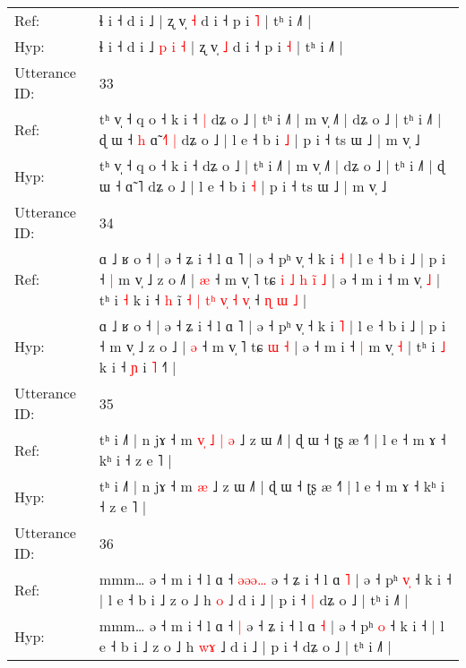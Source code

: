 \documentclass[10pt]{article}
\DeclareRobustCommand{\hl}[1]{{\textcolor{red}{#1}}}
\begin{document}
\begin{longtable}{ll}
Ref: & ɬ i ˧ d i ˩\hl{}\hl{}\hl{}\hl{}\hl{}\hl{} | ʐ v̩ \hl{˧} d i ˧ p i \hl{˥} | tʰ i ˩˥ |
 \\
Hyp: & ɬ i ˧ d i ˩\hl{ }\hl{p}\hl{ }\hl{i}\hl{ }\hl{˧} | ʐ v̩ \hl{˩} d i ˧ p i \hl{˧} | tʰ i ˩˥ |
 \\
\midrule
Utterance ID: & 33 \\
Ref: & tʰ v̩ ˧ q o ˧ k i ˧\hl{ }\hl{|} dʑ o ˩ | tʰ i ˩˥ | m v̩ ˩˥ | dʑ o ˩ | tʰ i ˩˥ | ɖ ɯ ˧\hl{ }\hl{h} ɑ̃ \hl{˧}˥\hl{ }\hl{|} dʑ o ˩ | l e ˧ b i \hl{˩} | p i ˧ ts ɯ ˩ | m v̩ ˩
 \\
Hyp: & tʰ v̩ ˧ q o ˧ k i ˧\hl{}\hl{} dʑ o ˩ | tʰ i ˩˥ | m v̩ ˩˥ | dʑ o ˩ | tʰ i ˩˥ | ɖ ɯ ˧\hl{}\hl{} ɑ̃ \hl{}˥\hl{}\hl{} dʑ o ˩ | l e ˧ b i \hl{˧} | p i ˧ ts ɯ ˩ | m v̩ ˩
 \\
\midrule
Utterance ID: & 34 \\
Ref: & ɑ ˩ ʁ o ˧ | ə ˧ ʑ i ˧ l ɑ ˥ | ə ˧ pʰ v̩ ˧ k i \hl{˧} | l e ˧ b i ˩ | p i ˧\hl{ }\hl{|} m v̩ ˩ z o ˩\hl{˥} | \hl{æ} ˧ m v̩ ˥ tɕ\hl{ }\hl{i}\hl{ }\hl{˩}\hl{ }\hl{h} \hl{i}\hl{̃} \hl{˩} | ə ˧ m i ˧\hl{}\hl{} m v̩ \hl{˩} | tʰ i \hl{˧} k i ˧ \hl{h} i\hl{̃}\hl{ }\hl{˧}\hl{ }\hl{|}\hl{ }\hl{t}\hl{ʰ}\hl{ }\hl{v}\hl{̩}\hl{ }\hl{˧} \hl{v}\hl{̩} ˧\hl{ }\hl{ɳ}\hl{ }\hl{ɯ}\hl{ }\hl{˩} |
 \\
Hyp: & ɑ ˩ ʁ o ˧ | ə ˧ ʑ i ˧ l ɑ ˥ | ə ˧ pʰ v̩ ˧ k i \hl{˥} | l e ˧ b i ˩ | p i ˧\hl{}\hl{} m v̩ ˩ z o ˩\hl{} | \hl{ə} ˧ m v̩ ˥ tɕ\hl{}\hl{}\hl{}\hl{}\hl{}\hl{} \hl{}\hl{ɯ} \hl{˧} | ə ˧ m i ˧\hl{ }\hl{|} m v̩ \hl{˧} | tʰ i \hl{˩} k i ˧ \hl{ɲ} i\hl{}\hl{}\hl{}\hl{}\hl{}\hl{}\hl{}\hl{}\hl{}\hl{}\hl{}\hl{}\hl{} \hl{}\hl{˥} ˧\hl{}\hl{}\hl{}\hl{}\hl{}\hl{˥} |
 \\
\midrule
Utterance ID: & 35 \\
Ref: & tʰ i ˩˥ | n jɤ ˧ m\hl{ }\hl{v}\hl{̩}\hl{ }\hl{˩}\hl{ }\hl{|} \hl{ə} ˩ z ɯ ˩˥ | ɖ ɯ ˧ ʈʂ æ ˧˥ | l e ˧ m ɤ ˧ kʰ i ˧ z e ˥ |
 \\
Hyp: & tʰ i ˩˥ | n jɤ ˧ m\hl{}\hl{}\hl{}\hl{}\hl{}\hl{}\hl{} \hl{æ} ˩ z ɯ ˩˥ | ɖ ɯ ˧ ʈʂ æ ˧˥ | l e ˧ m ɤ ˧ kʰ i ˧ z e ˥ |
 \\
\midrule
Utterance ID: & 36 \\
Ref: & mmm… ə ˧ m i ˧ l ɑ ˧ \hl{ə}\hl{ə}\hl{ə}\hl{…} ə ˧ ʑ i ˧ l ɑ \hl{˥} | ə ˧ pʰ \hl{v}\hl{̩} ˧ k i ˧ | l e ˧ b i ˩ z o ˩ h \hl{}\hl{o} ˩ d i ˩ | p i ˧\hl{ }\hl{|} dʑ o ˩ | tʰ i ˩˥ |
 \\
Hyp: & mmm… ə ˧ m i ˧ l ɑ ˧ \hl{}\hl{}\hl{}\hl{|} ə ˧ ʑ i ˧ l ɑ \hl{˧} | ə ˧ pʰ \hl{}\hl{o} ˧ k i ˧ | l e ˧ b i ˩ z o ˩ h \hl{w}\hl{ɤ} ˩ d i ˩ | p i ˧\hl{}\hl{} dʑ o ˩ | tʰ i ˩˥ |
 \\

\end{longtable}
\end{document}
